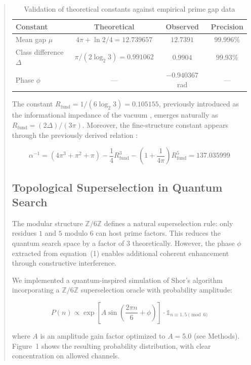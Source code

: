 \documentclass[pdflatex,sn-nature]{sn-jnl}
\theoremstyle{thmstyleone}
\theoremstyle{thmstyletwo}
\theoremstyle{thmstylethree}
\newcommand{\Zmod}{\mathbb{Z}/6\mathbb{Z}}
\newcommand{\Rfund}{R_{\text{fund}}}
\begin{document}
\begin{abstract}
\begin{table}[h]
\caption{Validation of theoretical constants against empirical prime gap data}
\label{tab:validation}
\begin{tabular}{lccc}
\toprule
\textbf{Constant} & \textbf{Theoretical} & \textbf{Observed} & \textbf{Precision} \\
\midrule
Mean gap $\mu$ & $4\pi + \ln 2/4 = 12.739657$ & $12.7391$ & $99.996\%$ \\
Class difference $\Delta$ & $\pi/(2\log_2 3) = 0.991062$ & $0.9904$ & $99.93\%$ \\
Phase $\phi$ & — & $-0.940367$ rad & — \\
\bottomrule
\end{tabular}
\end{table}

The constant $\Rfund = 1/(6\log_2 3) = 0.105155$, previously introduced as the informational impedance of the vacuum \cite{PeinadorGenesis}, emerges naturally as $\Rfund = (2\Delta)/(3\pi)$. Moreover, the fine-structure constant appears through the previously derived relation \cite{PeinadorGenesis}:

\begin{equation}
\alpha^{-1} = (4\pi^3 + \pi^2 + \pi) - \frac{1}{4}\Rfund^3 - \left(1+\frac{1}{4\pi}\right)\Rfund^5 = 137.035999
\label{eq:alpha}
\end{equation}

\subsection*{Topological Superselection in Quantum Search}

The modular structure $\Zmod$ defines a natural superselection rule: only residues $1$ and $5$ modulo $6$ can host prime factors. This reduces the quantum search space by a factor of $3$ theoretically. However, the phase $\phi$ extracted from equation~(1) enables additional coherent enhancement through constructive interference.

We implemented a quantum-inspired simulation of Shor's algorithm incorporating a $\Zmod$ superselection oracle with probability amplitude:

\begin{equation}
P(n) \propto \exp\left[A\sin\left(\frac{2\pi n}{6} + \phi\right)\right]\cdot \mathbb{1}_{n\equiv 1,5\pmod{6}}
\label{eq:quantum}
\end{equation}

where $A$ is an amplitude gain factor optimized to $A=5.0$ (see Methods). Figure~1 shows the resulting probability distribution, with clear concentration on allowed channels.


\end{abstract}
\end{document}
